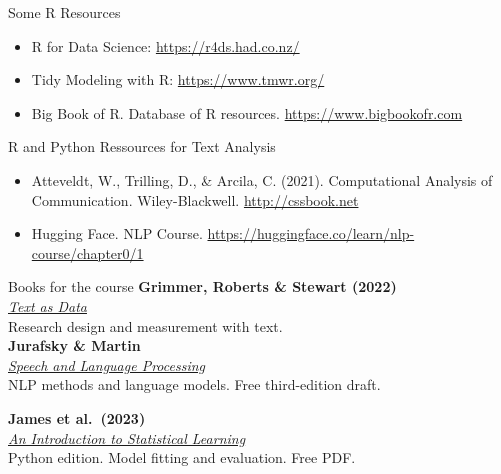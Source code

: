 \documentclass[11pt,aspectratio=43]{beamer}
\begin{document}
\begin{frame}{Some R Resources}
\begin{itemize}
\item R for Data Science: \url{https://r4ds.had.co.nz/}
\item Tidy Modeling with R: \url{https://www.tmwr.org/}
\item Big Book of R. Database of R resources. \url{https://www.bigbookofr.com}
\end{itemize}
\end{frame}


\begin{frame}{R and Python Ressources for Text Analysis}
\begin{itemize}
\item Atteveldt, W., Trilling, D., \& Arcila, C. (2021). Computational Analysis of Communication. Wiley-Blackwell. \url{http://cssbook.net}
\item Hugging Face. NLP Course. \url{https://huggingface.co/learn/nlp-course/chapter0/1}
\end{itemize}
\end{frame}

\begin{frame}{Books for the course}
\textbf{Grimmer, Roberts \& Stewart (2022)}\\
\href{https://politicalscience.stanford.edu/publications/text-data-new-framework-machine-learning-and-social-sciences}{\textcolor{blue!50!black}{\textit{Text as Data}}}\\
Research design and measurement with text.\\
\vspace{5mm}
\textbf{Jurafsky \& Martin}\\
\href{https://web.stanford.edu/~jurafsky/slp3/}{\textcolor{blue!50!black}{\textit{Speech and Language Processing}}}\\
NLP methods and language models. Free third-edition draft.
\vspace{5mm}

\textbf{James et al.\ (2023)}\\
\href{https://www.statlearning.com/}{\textcolor{blue!50!black}{\textit{An Introduction to Statistical Learning}}}\\
Python edition. Model fitting and evaluation. Free PDF.
\end{frame}
\end{document}
